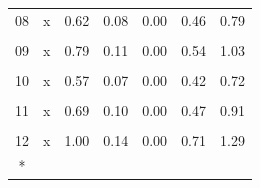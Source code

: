 \begin{longtable}[t]{ccrrrrr}
08 & x & 0.62 & 0.08 & 0.00 & 0.46 & 0.79\\
\cellcolor{gray!10}{09} & \cellcolor{gray!10}{(Intercept)} & \cellcolor{gray!10}{-80038.71} & \cellcolor{gray!10}{31635.33} & \cellcolor{gray!10}{0.03} & \cellcolor{gray!10}{-148966.16} & \cellcolor{gray!10}{-11111.25}\\
09 & x & 0.79 & 0.11 & 0.00 & 0.54 & 1.03\\
\cellcolor{gray!10}{10} & \cellcolor{gray!10}{(Intercept)} & \cellcolor{gray!10}{-29364.49} & \cellcolor{gray!10}{13166.80} & \cellcolor{gray!10}{0.05} & \cellcolor{gray!10}{-58052.49} & \cellcolor{gray!10}{-676.50}\\
10 & x & 0.57 & 0.07 & 0.00 & 0.42 & 0.72\\
\cellcolor{gray!10}{11} & \cellcolor{gray!10}{(Intercept)} & \cellcolor{gray!10}{-29318.60} & \cellcolor{gray!10}{9310.96} & \cellcolor{gray!10}{0.01} & \cellcolor{gray!10}{-49605.45} & \cellcolor{gray!10}{-9031.75}\\
11 & x & 0.69 & 0.10 & 0.00 & 0.47 & 0.91\\
\cellcolor{gray!10}{12} & \cellcolor{gray!10}{(Intercept)} & \cellcolor{gray!10}{-31305.91} & \cellcolor{gray!10}{6688.56} & \cellcolor{gray!10}{0.00} & \cellcolor{gray!10}{-45879.03} & \cellcolor{gray!10}{-16732.79}\\
12 & x & 1.00 & 0.14 & 0.00 & 0.71 & 1.29\\*
\end{longtable}
